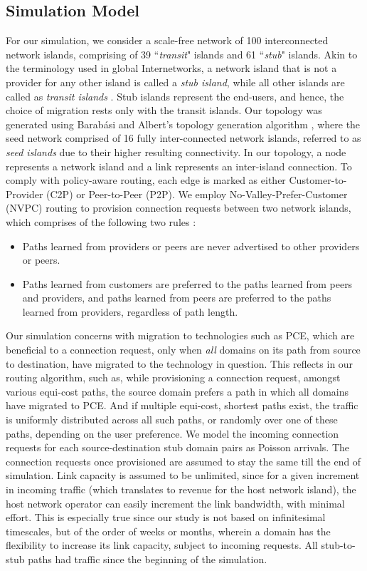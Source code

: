 \documentclass[smallextended]{svjour3}
\begin{document}
\subsection{Simulation Model}

For our simulation, we consider a scale-free network of 100 interconnected
network islands, comprising of 39 ``\emph{transit}" islands and 61
``\emph{stub}" islands.  Akin to the terminology used in global Internetworks, a
network island that is not a provider for any other island is called a
\emph{stub island}, while all other islands are called as \emph{transit islands}
\cite{gao}. Stub islands represent the end-users, and hence, the choice of
migration rests only with the transit islands. Our topology was generated using
Barab\'asi and Albert's topology generation algorithm \cite{Albert00}, where the
seed network comprised of 16 fully inter-connected network islands, referred to
as \emph{seed islands} due to their higher resulting connectivity.
In our topology, a node represents a network island and a link represents an
inter-island connection. To comply with policy-aware routing, each edge is
marked as either Customer-to-Provider (C2P) or Peer-to-Peer (P2P). We employ
No-Valley-Prefer-Customer (NVPC) routing to provision connection requests
between two network islands, which comprises of the following two
rules \cite{He12}:
\begin{itemize}
  \item Paths learned from providers or peers are never advertised to other providers or peers.
  \item Paths learned from customers are preferred to the paths learned from peers and providers, and paths learned from peers are preferred to the paths learned from providers, regardless of path length.
\end{itemize}

\par Our simulation concerns with migration
to technologies such as PCE, which are beneficial to a connection request, only
when \emph{all} domains on its path from source to destination, have migrated to
the technology in question. This reflects in our routing algorithm, such as,
while provisioning a connection request, amongst various equi-cost paths, the
source domain prefers a path in which all domains have migrated to PCE.
And if multiple equi-cost, shortest paths exist,
the traffic is uniformly distributed across all such paths, or randomly over
one of these paths, depending on the user preference. We model the incoming connection requests
for each source-destination stub domain pairs as Poisson arrivals. The connection requests once provisioned are assumed to stay the same till the end of simulation. Link capacity is
assumed to be unlimited, since for a given increment in incoming traffic (which
translates to revenue for the host network island), the host network operator
can easily increment the link bandwidth, with minimal effort. This is especially
true since our study is not based on infinitesimal timescales, but of the order
of weeks or months, wherein a domain has the flexibility to increase its link
capacity, subject to incoming requests. All stub-to-stub paths had traffic since
the beginning of the simulation.
\end{document}
